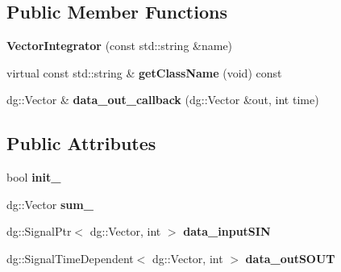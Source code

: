 \subsection*{Public Member Functions}
\begin{DoxyCompactItemize}
\item 
{\bfseries Vector\+Integrator} (const std\+::string \&name)\hypertarget{classdg__tools_1_1VectorIntegrator_a5c5a7948e49ca2f7d8948a3e0a7439f9}{}\label{classdg__tools_1_1VectorIntegrator_a5c5a7948e49ca2f7d8948a3e0a7439f9}

\item 
virtual const std\+::string \& {\bfseries get\+Class\+Name} (void) const \hypertarget{classdg__tools_1_1VectorIntegrator_a55bebcac4a036c6ff5a3d5be426f27f1}{}\label{classdg__tools_1_1VectorIntegrator_a55bebcac4a036c6ff5a3d5be426f27f1}

\item 
dg\+::\+Vector \& {\bfseries data\+\_\+out\+\_\+callback} (dg\+::\+Vector \&out, int time)\hypertarget{classdg__tools_1_1VectorIntegrator_a3cef1ad9ec653e4d63defedffe3c77d8}{}\label{classdg__tools_1_1VectorIntegrator_a3cef1ad9ec653e4d63defedffe3c77d8}

\end{DoxyCompactItemize}
\subsection*{Public Attributes}
\begin{DoxyCompactItemize}
\item 
bool {\bfseries init\+\_\+}\hypertarget{classdg__tools_1_1VectorIntegrator_a8aacd28288e12d92755fa2ce030998e1}{}\label{classdg__tools_1_1VectorIntegrator_a8aacd28288e12d92755fa2ce030998e1}

\item 
dg\+::\+Vector {\bfseries sum\+\_\+}\hypertarget{classdg__tools_1_1VectorIntegrator_a3e03f4e2fbe8d86f0e5aada6974382ef}{}\label{classdg__tools_1_1VectorIntegrator_a3e03f4e2fbe8d86f0e5aada6974382ef}

\item 
dg\+::\+Signal\+Ptr$<$ dg\+::\+Vector, int $>$ {\bfseries data\+\_\+input\+S\+IN}\hypertarget{classdg__tools_1_1VectorIntegrator_a3486ac49f8e7880954a8dfb29c2e5b18}{}\label{classdg__tools_1_1VectorIntegrator_a3486ac49f8e7880954a8dfb29c2e5b18}

\item 
dg\+::\+Signal\+Time\+Dependent$<$ dg\+::\+Vector, int $>$ {\bfseries data\+\_\+out\+S\+O\+UT}\hypertarget{classdg__tools_1_1VectorIntegrator_ae43ece8351fc054437144e0b8369bf88}{}\label{classdg__tools_1_1VectorIntegrator_ae43ece8351fc054437144e0b8369bf88}

\end{DoxyCompactItemize}
